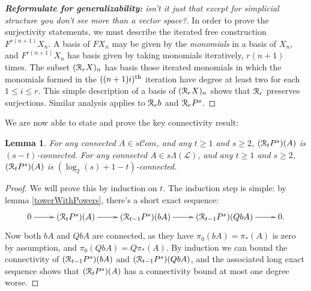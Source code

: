 \documentclass[11pt]{amsart}
\theoremstyle{plain}
\newtheorem{lem}[thm]{Lemma}
\theoremstyle{definition}
\newcommand{\scrL}{\mathscr{L}}
\newcommand{\scrC}{\mathscr{C}}
\newcommand{\calR}{\mathcal{R}}
\theoremstyle{plain}
\newcommand{\LieOperad}{{\scrL}}
\newcommand{\algs}{{\scrC\!\textit{om}}}
\newcommand{\caldup}[1]{\calR_{\smash{#1}}}
\newcommand{\barConstructionMightAbbreviate}{b}
\begin{document}
\begin{Bousfield-Kan spectral sequence}
\begin{proof}
[\textbf{Reformulate for generalizability:} isn't it just that except for simplicial structure you don't see more than a vector space?] In order to prove the surjectivity statements, we must describe the iterated free construction $F^{r(n+1)}X_n$. A basis of $FX_n$ may be given by the \emph{monomials} in a basis of $X_n$, and $F^{r(n+1)}X_n$ has basis given by taking monomials iteratively, $r(n+1)$ times. The subset $(\caldup{r}X)_n$ has basis those iterated monomials in which the monomials formed in the $((n+1)i)^\textup{th}$ iteration have degree at least two for each $1\leq i\leq r$. This simple description of a basis of $(\caldup{r}X)_n$ shows that $\caldup{r}$ preserves surjections. Similar analysis applies to $\caldup{r}\barConstructionMightAbbreviate $ and $\caldup{r}P^s$.
\end{proof}
We are now able to state and prove the key connectivity result:
\begin{lem}\label{connectivityOfDerivedPowers}
For any connected $A\in s\algs$, and any $t\geq1$ and $s\geq2$, $(\caldup{t}P^{s})(A)$ is $(s-t)$-connected.
For any connected $A\in s\Lambda(\LieOperad)$, and any $t\geq1$ and $s\geq2$, $(\caldup{t}P^{s})(A)$ is $(\log_2(s)+1-t)$-connected.
\end{lem}
\begin{proof}
We will prove this by induction on $t$. The induction step is simple: %
by lemma \ref{towerWithPowers}, there's a short exact sequence:
\[\xymatrix{
0\ar[r]&
(\caldup{t}P^{s})(A)\ar[r]&
(\caldup{t-1}P^{s})(\barConstructionMightAbbreviate A)\ar[r]&
(\caldup{t-1}P^{s})(Q\barConstructionMightAbbreviate A)\ar[r]&
0.
}\]
Now both $bA$ and $QbA$ are connected, as they have $\pi_0(bA)=\pi_*(A)$ is zero by assumption, and $\pi_0(QbA)=Q\pi_*(A)$. By induction we can bound the connectivity of $(\caldup{t-1}P^{s})(\barConstructionMightAbbreviate A)$ and $(\caldup{t-1}P^{s})(Q\barConstructionMightAbbreviate A)$, and the associated long exact sequence shows that $(\caldup{t}P^{s})(A)$ has a connectivity bound at most one degree worse.



\end{proof}
\end{Bousfield-Kan spectral sequence}
\end{document}
